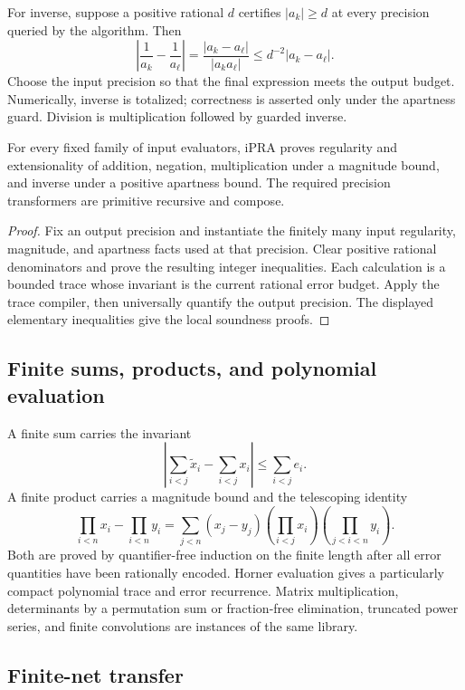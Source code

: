 For inverse, suppose a positive rational \(d\) certifies
\(|a_k|\ge d\) at every precision queried by the algorithm.  Then
\[
 \left|\frac1{a_k}-\frac1{a_\ell}\right|
 =\frac{|a_k-a_\ell|}{|a_ka_\ell|}
 \le d^{-2}|a_k-a_\ell|.
\]
Choose the input precision so that the final expression meets the output
budget.  Numerically, inverse is totalized; correctness is asserted only under
the apartness guard.  Division is multiplication followed by guarded inverse.

\begin{theorem}
\label{thm:regular-name-arithmetic}
For every fixed family of input evaluators, iPRA proves regularity and
extensionality of addition, negation, multiplication under a magnitude bound,
and inverse under a positive apartness bound.  The required precision
transformers are primitive recursive and compose.
\end{theorem}

\begin{proof}
Fix an output precision and instantiate the finitely many input regularity,
magnitude, and apartness facts used at that precision.  Clear positive
rational denominators and prove the resulting integer inequalities.  Each
calculation is a bounded trace whose invariant is the current rational error
budget.  Apply the trace compiler, then universally quantify the output
precision.  The displayed elementary inequalities give the local soundness
proofs.
\end{proof}

\subsection{Finite sums, products, and polynomial evaluation}

A finite sum carries the invariant
\[
 \left|\sum_{i<j}\widetilde x_i-
       \sum_{i<j}x_i\right|
 \le \sum_{i<j}e_i.
\]
A finite product carries a magnitude bound and the telescoping identity
\[
 \prod_{i<n}x_i-\prod_{i<n}y_i
 =\sum_{j<n}(x_j-y_j)
   \left(\prod_{i<j}x_i\right)
   \left(\prod_{j<i<n}y_i\right).
\]
Both are proved by quantifier-free induction on the finite length after all
error quantities have been rationally encoded.  Horner evaluation gives a
particularly compact polynomial trace and error recurrence.  Matrix
multiplication, determinants by a permutation sum or fraction-free
elimination, truncated power series, and finite convolutions are instances of
the same library.

\subsection{Finite-net transfer}

